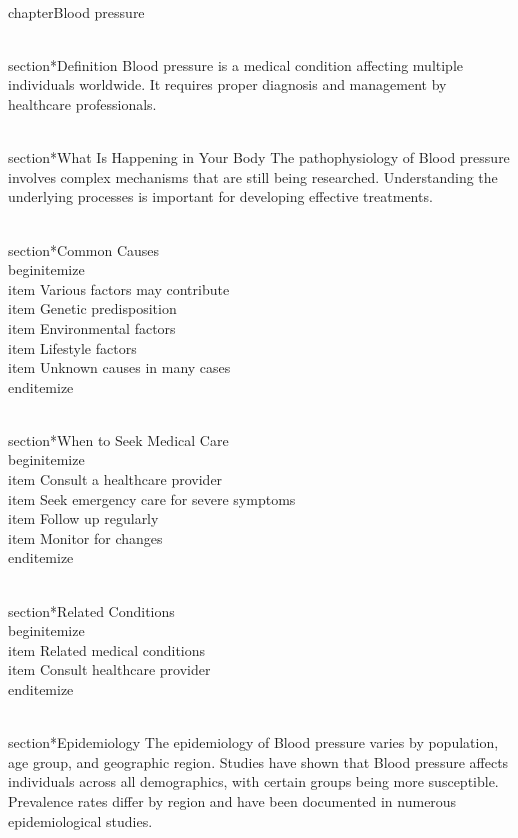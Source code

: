 
\\chapter{Blood pressure}

\\section*{Definition}
Blood pressure is a medical condition affecting multiple individuals worldwide. It requires proper diagnosis and management by healthcare professionals.

\\section*{What Is Happening in Your Body}
The pathophysiology of Blood pressure involves complex mechanisms that are still being researched. Understanding the underlying processes is important for developing effective treatments.

\\section*{Common Causes}
\\begin{itemize}
\\item Various factors may contribute\n  \\item Genetic predisposition\n  \\item Environmental factors\n  \\item Lifestyle factors\n  \\item Unknown causes in many cases
\\end{itemize}

\\section*{When to Seek Medical Care}
\\begin{itemize}
\\item Consult a healthcare provider\n  \\item Seek emergency care for severe symptoms\n  \\item Follow up regularly\n  \\item Monitor for changes
\\end{itemize}

\\section*{Related Conditions}
\\begin{itemize}
\\item Related medical conditions\n  \\item Consult healthcare provider
\\end{itemize}

\\section*{Epidemiology}
The epidemiology of Blood pressure varies by population, age group, and geographic region. Studies have shown that Blood pressure affects individuals across all demographics, with certain groups being more susceptible. Prevalence rates differ by region and have been documented in numerous epidemiological studies.

